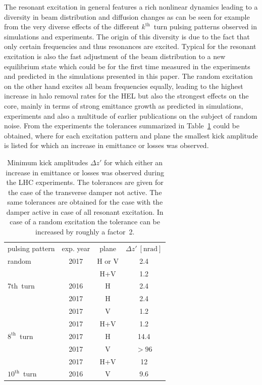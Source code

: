 \documentclass[%
 reprint,
 amsmath,amssymb,
 aps,
prstab,
longbibliography
]{revtex4-1}
\begin{document}
The resonant excitation in general features a rich nonlinear dynamics leading to a diversity in beam distribution and diffusion changes as can be seen for example from the very diverse effects of the different $k^{\mathrm{th}}$~turn pulsing patterns observed in simulations and experiments. The origin of this diversity is due to the fact that only certain frequencies and thus resonances are excited. Typical for the resonant excitation is also the fast adjustment of the beam distribution to a new equilibrium state which could be for the first time measured in the experiments and predicted in the simulations presented in this paper. The random excitation on the other hand excites all beam frequencies equally, leading to the highest increase in halo removal rates for the HEL \cite{hel_halo_hllhc_fitterer} but also the strongest effects on the core, mainly in terms of strong emittance growth as predicted in simulations, experiments and also a multitude of earlier publications on the subject of random noise. From the experiments the tolerances summarized in Table~\ref{tab:tolexp} could be obtained, where for each excitation pattern and plane the smallest kick amplitude is listed for which an increase in emittance or losses was observed.
\begin{table}
	\caption{\label{tab:tolexp}%
		Minimum kick amplitudes $\Delta z'$ for which either an increase in emittance or losses was observed during the LHC experiments. The tolerances are given for the case of the transverse damper not active. The same tolerances are obtained for the case with the damper active in case of all resonant excitation. In case of a random excitation the tolerance can be increased by roughly a factor~2.
	}
	\begin{ruledtabular}
		\begin{tabular}{lccc}
		pulsing pattern & exp. year & plane & $\Delta z' \ [\mathrm{nrad}]$  \\
			\colrule
			random & 2017 & H or V & 2.4 \\
			 & & H+V & 1.2 \\\hline
			7th~turn & 2016 & H & 2.4 \\
			 & 2017 & H & 2.4 \\
			 & 2017 & V & 1.2 \\
			 & 2017 & H+V & 1.2 \\\hline
			$8^{\mathrm{th}}$~turn & 2017 & H & 14.4 \\
			& 2017 & V & $>96$ \\
			& 2017 & H+V & 12 \\\hline
			$10^{\mathrm{th}}$~turn & 2016 & V & 9.6 \\
		\end{tabular}
	\end{ruledtabular}
\end{table}
\end{document}
